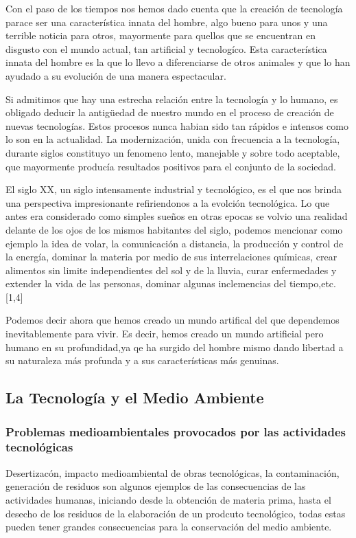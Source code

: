 \documentclass{bmcart}
\begin{document}
Con el paso de los tiempos nos hemos dado cuenta que la creación de tecnología parace ser una característica innata del hombre, algo bueno para unos y una terrible noticia para otros, mayormente para quellos que se encuentran en disgusto con el mundo actual, tan artificial y tecnologíco. Esta característica innata del hombre es la que lo llevo a diferenciarse de otros animales y que lo han ayudado a su evolución de una manera espectacular.\smallskip

Si admitimos que hay una estrecha relación entre la tecnología y lo humano, es obligado deducir la antigüedad de nuestro mundo en el proceso de creación de nuevas tecnologías. Estos procesos nunca habian sido tan rápidos e intensos como lo son en la actualidad. La modernización, unida con frecuencia a la tecnología, durante siglos constituyo un fenomeno lento, manejable y sobre todo aceptable, que mayormente producía resultados positivos para el conjunto de la sociedad.\smallskip

El siglo XX, un siglo intensamente industrial y tecnológico, es el que nos brinda una perspectiva impresionante refiriendonos a la evolción tecnológica. Lo que antes era considerado como simples sueños en otras epocas se volvio una realidad delante de los ojos de los mismos habitantes del siglo, podemos mencionar como ejemplo la idea de volar, la comunicación a distancia, la producción y control de la energía, dominar la materia por medio de sus interrelaciones químicas, crear alimentos sin limite independientes del sol y de la lluvia, curar enfermedades y extender la vida de las personas, dominar algunas inclemencias del tiempo,etc.[1,4]\smallskip

Podemos decir ahora que hemos creado un mundo artifical del que dependemos inevitablemente para vivir. Es decir, hemos creado un mundo artificial pero humano en su profundidad,ya qe ha surgido del hombre mismo dando libertad a su naturaleza más profunda y a sus características más genuinas.\smallskip

\subsection*{La Tecnología y el Medio Ambiente}
\smallskip
\subsubsection*{Problemas medioambientales provocados por las actividades tecnológicas}
Desertizacón, impacto medioambiental de obras tecnológicas, la contaminación, generación de residuos son algunos ejemplos de las consecuencias de las actividades humanas, iniciando desde la obtención de materia prima, hasta el desecho de los residuos de la elaboración de un prodcuto tecnológico, todas estas pueden tener grandes consecuencias para la conservación del medio ambiente.\smallskip
\end{document}
